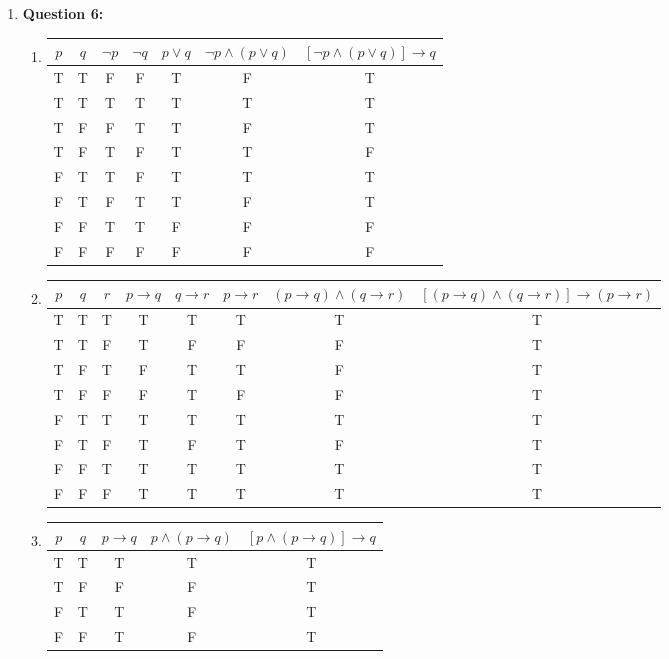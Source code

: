 \documentclass[11pt]{article}
\begin{document}
\begin{enumerate}
\item
\textbf{Question 6:}

\begin{enumerate}[label=(\alph*)]
\item
\begin{center}
\begin{tabular}{|c|c|c|c|c|c|c|}
\hline
$p$ & $q$ & $\lnot p$ & $\lnot q$ & $p \lor q$ & $\lnot p \land (p \lor q)$ & $[\lnot p \land (p \lor q)] \rightarrow q$\\
\hline
T & T & F & F & T & F & T\\
T & T & T & T & T & T & T\\
T & F & F & T & T & F & T\\
T & F & T & F & T & T & F\\
F & T & T & F & T & T & T\\
F & T & F & T & T & F & T\\
F & F & T & T & F & F & F\\
F & F & F & F & F & F & F\\
\hline
\end{tabular}
\end{center}

\item
\begin{center}
\begin{tabular}{|c|c|c|c|c|c|c|c|}
\hline
$p$ & $q$ & $r$ & $p \rightarrow q$ & $q \rightarrow r$ & $p \rightarrow r$ & $(p \rightarrow q) \land (q \rightarrow r)$ & $[(p \rightarrow q) \land (q \rightarrow r)] \rightarrow (p \rightarrow r)$\\
\hline
T & T & T & T & T & T & T & T\\
T & T & F & T & F & F & F & T\\
T & F & T & F & T & T & F & T\\
T & F & F & F & T & F & F & T\\
F & T & T & T & T & T & T & T\\
F & T & F & T & F & T & F & T\\
F & F & T & T & T & T & T & T\\
F & F & F & T & T & T & T & T\\
\hline
\end{tabular}
\end{center}

\item
\begin{center}
\begin{tabular}{|c|c|c|c|c|}
\hline
$p$ & $q$ & $p \rightarrow q$ & $p \land (p \rightarrow q)$ & $[p \land (p \rightarrow q)] \rightarrow q$\\
\hline
T & T & T & T & T\\
T & F & F & F & T\\
F & T & T & F & T\\
F & F & T & F & T\\
\hline
\end{tabular}
\end{center}
\end{enumerate}

\end{enumerate}
\end{document}

